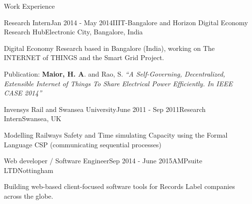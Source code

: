 \documentclass{resume} %
\begin{document}
\begin{rSection}{Work Experience}

	\begin{rSubsection}{Research Intern}{Jan 2014 - May 2014}{IIIT-Bangalore and Horizon Digital Economy Research Hub}{Electronic City, Bangalore, India}
		\item Digital Economy Research based in Bangalore (India), working on The INTERNET of THINGS and the Smart Grid Project.
		\item Publication: \textbf{Maior, H. A}. and Rao, S.  \emph{``A Self-Governing, Decentralized, Extensible Internet of Things To Share Electrical Power Efficiently. In IEEE CASE 2014''}
	\end{rSubsection}
\vspace{-1 mm}
	\begin{rSubsection}{Invensys Rail and Swansea University}{June 2011 - Sep 2011}{Research Intern}{Swansea, UK}
		\item Modelling Railways Safety and Time simulating Capacity using the Formal Language CSP (communicating sequential processes)
	\end{rSubsection}

\vspace{-2 mm}
  \begin{rSubsection}{Web developer / Software Engineer}{Sep 2014 - June 2015}{AMPsuite LTD}{Nottingham}
        \item Building web-based client-focused software tools for Records Label companies across the globe. 
    \end{rSubsection}

\end{rSection}
\end{document}
